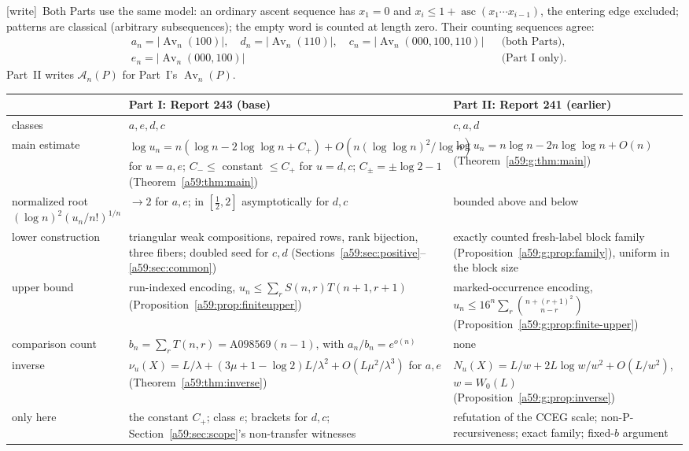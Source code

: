 \documentclass[11pt,letterpaper]{article}
\theoremstyle{remark}\newtheorem{remark}[theorem]{Remark}
\newcommand{\asc}{\operatorname{asc}}\newcommand{\Av}{\operatorname{Av}}\newcommand{\N}{\mathbb N}\newcommand{\E}{\mathbb E}\newcommand{\Prob}{\mathbb P}
\newcommand{\A}{\mathcal A}
\newcommand{\wtag}{\textup{[write]}}
\theoremstyle{remark}\newtheorem{wremark}{Remark}\renewcommand{\thewremark}{W\arabic{wremark}}
\theoremstyle{plain}\newtheorem{wcorollary}[wremark]{Corollary}
\begin{document}
\wtag\ Both Parts use the same model: an ordinary ascent sequence has
$x_1=0$ and $x_i\le1+\asc(x_1\cdots x_{i-1})$, the entering edge excluded;
patterns are classical (arbitrary subsequences); the empty word is counted
at length zero. Their counting sequences agree:
\begin{align*}
 &a_n=|\Av_n(100)|,\quad d_n=|\Av_n(110)|,\quad
 c_n=|\Av_n(000,100,110)|&&\text{(both Parts)},\\
 &e_n=|\Av_n(000,100)|&&\text{(Part~I only)}.
\end{align*}
Part~II writes $\A_n(P)$ for Part~I's $\Av_n(P)$.

\begin{center}
\small
\begin{tabular}{@{}>{\raggedright\arraybackslash}p{}>{\raggedright\arraybackslash}p{}>{\raggedright\arraybackslash}p{}@{}}
\toprule
& Part I: Report 243 (base) & Part II: Report 241 (earlier)\\
\midrule
classes & $a,e,d,c$ & $c,a,d$\\
main estimate & $\log u_n=n(\log n-2\log\log n+C_+)+O(n(\log\log n)^2/\log n)$ for $u=a,e$; $C_-\le$ constant $\le C_+$ for $u=d,c$; $C_\pm=\pm\log2-1$ (Theorem~\ref{a59:thm:main}) & $\log u_n=n\log n-2n\log\log n+O(n)$ (Theorem~\ref{a59:g:thm:main})\\
normalized root $(\log n)^2(u_n/n!)^{1/n}$ & $\to2$ for $a,e$; in $[\frac12,2]$ asymptotically for $d,c$ & bounded above and below\\
lower construction & triangular weak compositions, repaired rows, rank bijection, three fibers; doubled seed for $c,d$ (Sections~\ref{a59:sec:positive}--\ref{a59:sec:common}) & exactly counted fresh-label block family (Proposition~\ref{a59:g:prop:family}), uniform in the block size\\
upper bound & run-indexed encoding, $u_n\le\sum_rS(n,r)T(n+1,r+1)$ (Proposition~\ref{a59:prop:finiteupper}) & marked-occurrence encoding, $u_n\le16^n\sum_r\binom{n+(r+1)^2}{n-r}$ (Proposition~\ref{a59:g:prop:finite-upper})\\
comparison count & $b_n=\sum_rT(n,r)=\mathrm{A098569}(n-1)$, with $a_n/b_n=e^{o(n)}$ & none\\
inverse & $\nu_u(X)=L/\lambda+(3\mu+1-\log2)L/\lambda^2+O(L\mu^2/\lambda^3)$ for $a,e$ (Theorem~\ref{a59:thm:inverse}) & $N_u(X)=L/w+2L\log w/w^2+O(L/w^2)$, $w=W_0(L)$ (Proposition~\ref{a59:g:prop:inverse})\\
only here & the constant $C_+$; class $e$; brackets for $d,c$; Section~\ref{a59:sec:scope}'s non-transfer witnesses & refutation of the CCEG scale; non-P-recursiveness; exact family; fixed-$b$ argument\\
\bottomrule
\end{tabular}
\end{center}
\end{document}
